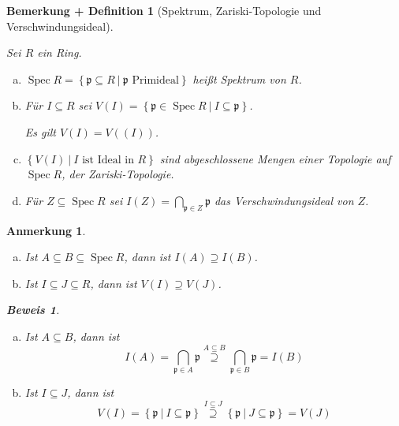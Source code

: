 \documentclass[a4paper,oneside]{scrbook}
\theoremstyle{break}
\newtheorem{BemDef}[Def]{Bemerkung + Definition}
\theoremstyle{nonumberbreak}
\theoremstyle{nonumberplain}
\newtheorem{Bew}{Beweis}
\theoremstyle{break}
\newtheorem{anmerkung}{Anmerkung}
\newcommand{\Spec}{%
	\ensuremath{\operatorname{Spec}}%
}
\begin{document}
\begin{BemDef}[Spektrum, Zariski-Topologie und Verschwindungsideal]

	\label{def:spectrum}
	\label{def:zariski_topology}

	Sei $R$ ein Ring.
	\begin{enumerate}[(a)]
		\item $\Spec R = \left\{ \mathfrak{p} \subseteq R\ |\ \mathfrak{p} \text{ Primideal}\right\}$ heißt \emph{Spektrum} von $R$.
		\item Für $I \subseteq R$ sei $V\left(I\right) = \left\{ \mathfrak{p} \in \Spec R\ |\ I \subseteq \mathfrak{p} \right\}$. 
		
		Es gilt $V\left( I \right) = V( ( I ) )$.
		\item $\left\{ V\left(I\right)\ |\  I \text{ ist Ideal in } R\right\}$ sind abgeschlossene Mengen einer Topologie auf $\Spec R$, der \emph{Zariski-Topologie}.
		\item Für $Z \subseteq \Spec R$ sei $I\left(Z\right) = \bigcap_{\mathfrak{p} \in Z} \mathfrak{p}$ das \emph{Verschwindungsideal} von $Z$.
	\end{enumerate}
\end{BemDef}



\begin{anmerkung}
	\begin{enumerate}[(a)]
		\item Ist $A \subseteq B \subseteq \Spec R$, dann ist $I\left(A\right) \supseteq I(B)$.
		\item Ist $I \subseteq J \subseteq R$, dann ist $V\left(I\right) \supseteq V(J)$.
	\end{enumerate}
	\begin{Bew}
		\begin{enumerate}[(a)]
			\item Ist $A \subseteq B$, dann ist
				\[ 
					I\left(A\right) = \bigcap_{\mathfrak{p}\in A} \mathfrak{p} 
					\overset{A \subseteq B}{\supseteq} 
					\bigcap_{\mathfrak{p} \in B} \mathfrak{p} = I\left(B\right)
				\]
			\item Ist $I \subseteq J$, dann ist
				\[
					V\left(I\right) = \left\{ \mathfrak{p}\ |\ I \subseteq \mathfrak{p} \right\} 
					\overset{I \subseteq J}{\supseteq}
					\left\{ \mathfrak{p}\ |\ J \subseteq \mathfrak{p} \right\}
					= V\left(J\right)
				\]
		\end{enumerate}
	\end{Bew}
\end{anmerkung}
\end{document}
